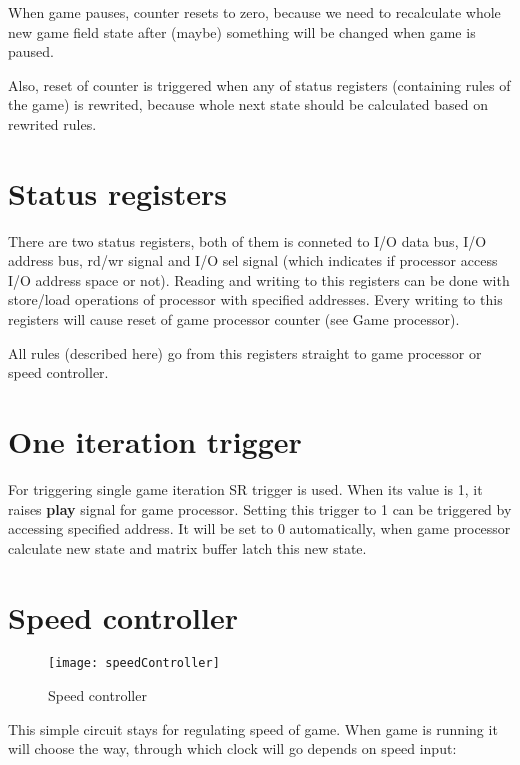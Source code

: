 When game pauses, counter resets to zero, because we need to recalculate whole new game field state after (maybe) something will be changed when game is paused. 

Also, reset of counter is triggered when any of status registers (containing rules of the game) is rewrited, because whole next state should be calculated based on rewrited rules.

\section*{Status registers}

There are two status registers, both of them is conneted to I/O data bus, I/O address bus, rd/wr signal and I/O sel signal (which indicates if processor access I/O address space or not). Reading and writing to this registers can be done with store/load operations of processor with specified addresses. Every writing to this registers will cause reset of game processor counter (see Game processor).

All rules (described here) go from this registers straight to game processor or speed controller.

\section*{One iteration trigger}

For triggering single game iteration SR trigger is used. When its value is 1, it raises \textbf{play} signal for game processor. Setting this trigger to 1 can be triggered by accessing specified address. It will be set to 0 automatically, when game processor calculate new state and matrix buffer latch this new state.

\section*{Speed controller}

\begin{figure}[ht]
	\centering
	\texttt{[image: speedController]}
	\caption{Speed controller}
\end{figure}

This simple circuit stays for regulating speed of game. When game is running it will choose the way, through which clock will go depends on speed input:

